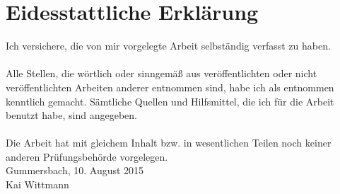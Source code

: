 \chapter*{Eidesstattliche Erklärung}
Ich versichere, die von mir vorgelegte Arbeit selbständig verfasst zu haben.\\ \\
Alle Stellen, die wörtlich oder sinngemäß aus veröffentlichten oder nicht veröffentlichten Arbeiten anderer entnommen sind, habe ich als entnommen kenntlich gemacht. Sämtliche Quellen und Hilfsmittel, die ich für die Arbeit benutzt habe, sind angegeben.\\ \\
Die Arbeit hat mit gleichem Inhalt bzw. in wesentlichen Teilen noch keiner anderen Prüfungsbehörde vorgelegen.
\vspace{1.5cm}
\\
Gummersbach, 10. August 2015
\vspace{3cm}
\\
Kai Wittmann



